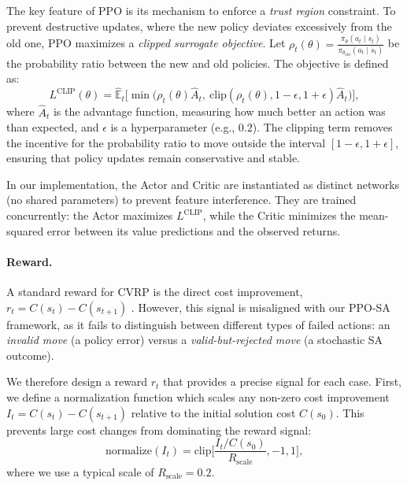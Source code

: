 \documentclass[letterpaper]{article} %
\begin{document}
The key feature of PPO is its mechanism to enforce a \emph{trust region} constraint. To prevent destructive updates, where the new policy deviates excessively from the old one, PPO maximizes a \emph{clipped surrogate objective}. Let $\rho_t(\theta) = \frac{\pi_{\theta}(a_t \mid s_t)}{\pi_{\theta_{\text{old}}}(a_t \mid s_t)}$ be the probability ratio between the new and old policies. The objective is defined as:
\begin{equation*}
    L^{\text{CLIP}}(\theta) = \hat{\mathbb{E}}_t \Big[ \min \big( \rho_t(\theta) \hat{A}_t, \ \text{clip}(\rho_t(\theta), 1 - \epsilon, 1 + \epsilon) \hat{A}_t \big) \Big],
\end{equation*}
where $\hat{A}_t$ is the advantage function, measuring how much better an action was than expected, and $\epsilon$ is a hyperparameter (e.g., $0.2$). The clipping term removes the incentive for the probability ratio to move outside the interval $[1 - \epsilon, 1 + \epsilon]$, ensuring that policy updates remain conservative and stable.

In our implementation, the Actor and Critic are instantiated as distinct networks (no shared parameters) to prevent feature interference. They are trained concurrently: the Actor maximizes $L^{\text{CLIP}}$, while the Critic minimizes the mean-squared error between its value predictions and the observed returns.


\paragraph{Reward.}

A standard reward for CVRP is the direct cost improvement, $r_t = C(s_t) - C(s_{t+1})$ \citep{correia_neural_2023}. However, this signal is misaligned with our PPO-SA framework, as it fails to distinguish between different types of failed actions: an \textit{invalid move} (a policy error) versus a \textit{valid-but-rejected move} (a stochastic SA outcome).

We therefore design a reward $r_t$ that provides a precise signal for each case. First, we define a normalization function which scales any non-zero cost improvement $I_t = C(s_t)-C(s_{t+1})$ relative to the initial solution cost $C(s_0)$. This prevents large cost changes from dominating the reward signal:
\begin{equation*}
    \text{normalize}(I_t) = \text{clip} \Big[ \frac{I_t / C(s_0)}{R_{\text{scale}}}, -1, 1 \Big] ,
\label{eq:reward_norm}
\end{equation*}
where we use a typical scale of $R_{\text{scale}} = 0.2$.
\end{document}
